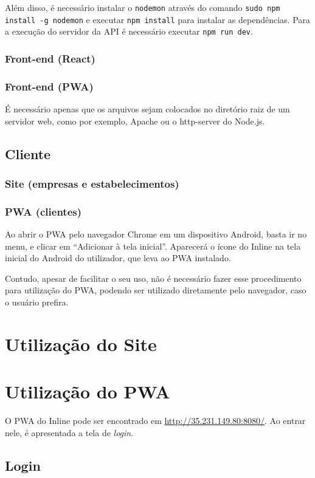 \documentclass{book}
\begin{document}
Além disso, é necessário instalar o \verb|nodemon| através do comando
\verb|sudo npm install -g nodemon| e executar \verb|npm install| para instalar
as dependências. Para a execução do servidor da API é necessário executar
\verb|npm run dev|.

\subsection{Front-end (React)}

\subsection{Front-end (PWA)}
É necessário apenas que os arquivos sejam colocados no diretório raiz de um
servidor web, como por exemplo, Apache ou o http-server do Node.js.

\section{Cliente}
\subsection{Site (empresas e estabelecimentos)}
\subsection{PWA (clientes)}
Ao abrir o PWA pelo navegador Chrome em um dispositivo Android, basta ir no
menu, e clicar em ``Adicionar à tela inicial''. Aparecerá o ícone do Inline
na tela inicial do Android do utilizador, que leva ao PWA instalado.

Contudo, apesar de facilitar o seu uso, não é necessário fazer esse procedimento
para utilização do PWA, podendo ser utilizado diretamente pelo navegador, caso o
usuário prefira.

\chapter{Utilização do Site}

\chapter{Utilização do PWA}

O PWA do Inline pode ser encontrado em \url{http://35.231.149.80:8080/}. Ao
entrar nele, é apresentada a tela de \textit{login}. 

\section{Login}
\end{document}
